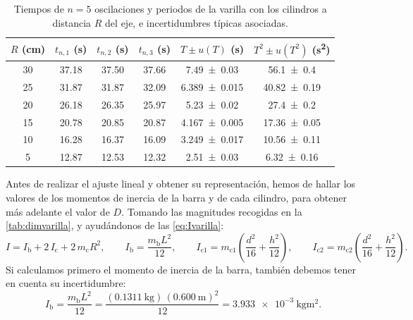 \documentclass[a4paper,11pt]{amsart}
\numberwithin{equation}{section}
\newcommand{\Ib}{I_{\mathrm{b}}}              %
\newcommand{\Ic}{I_{\mathrm{c}}}              %
\newcommand{\mb}{m_{\mathrm{b}}}
\newcommand{\mc}{m_{\mathrm{c}}}
\theoremstyle{cienplano}
\theoremstyle{ciendef}
\theoremstyle{cienobs}
\begin{document}
\begin{table}[ht]
\centering
\caption{Tiempos de $n=5$ oscilaciones y periodos de la varilla con los
cilindros a distancia $R$ del eje, e incertidumbres típicas asociadas.}
\label{tab:varilla}
\renewcommand{\arraystretch}{1.2}
\begin{tabular}{@{}c c c c c c@{}}
\toprule
$R$ (\si{\centi\meter}) & $t_{n,1}$ (\si{\second}) & $t_{n,2}$ (\si{\second}) &
$t_{n,3}$ (\si{\second}) & $T\pm u(T)$ (\si{\second}) & $T^{2}\pm u(T^{2})$ (\si{\second\squared}) \\
\midrule
30 & \num{37,18} & \num{37,50} & \num{37,66} & \num{7,49 \pm 0,03}    & \num{56,1 \pm 0,4} \\
25 & \num{31,87} & \num{31,87} & \num{32,09} & \num{6,389 \pm 0,015}  & \num{40,82 \pm 0,19} \\
20 & \num{26,18} & \num{26,35} & \num{25,97} & \num{5,23 \pm 0,02}    & \num{27,4 \pm 0,2} \\
15 & \num{20,78} & \num{20,85} & \num{20,87} & \num{4,167 \pm 0,005}  & \num{17,36 \pm 0,05} \\
10 & \num{16,28} & \num{16,37} & \num{16,09} & \num{3,249 \pm 0,017}  & \num{10,56 \pm 0,11} \\
5  & \num{12,87} & \num{12,53} & \num{12,32} & \num{2,51 \pm 0,03}    & \num{6,32 \pm 0,16} \\
\bottomrule
\end{tabular}
\end{table}

Antes de realizar el ajuste lineal y obtener su representación, hemos de
hallar los valores de los momentos de inercia de la barra y de cada cilindro,
para obtener más adelante el valor de $D$. Tomando las magnitudes recogidas
en la \cref{tab:dimvarilla}, y ayudándonos de las \cref{eq:Ivarilla}:
\begin{equation*}
  I=\Ib+2\,\Ic+2\,\mc R^{2},
  \qquad
  \Ib=\frac{\mb L^{2}}{12},
  \qquad
  I_{\mathrm{c}1}=m_{\mathrm{c}1}\left(\frac{d^{2}}{16}+\frac{h^{2}}{12}\right),
  \qquad
  I_{\mathrm{c}2}=m_{\mathrm{c}2}\left(\frac{d^{2}}{16}+\frac{h^{2}}{12}\right).
\end{equation*}
Si calculamos primero el momento de inercia de la barra, también debemos
tener en cuenta su incertidumbre:
\begin{equation*}
  \Ib=\frac{\mb L^{2}}{12}
     =\frac{(\SI{0,1311}{\kilogram})\,(\SI{0,600}{\meter})^{2}}{12}
     =\SI{3,933e-3}{\kilogram\meter\squared}.
\end{equation*}
\end{document}

